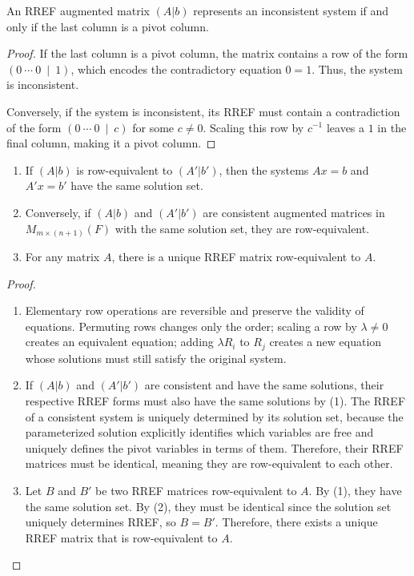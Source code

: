 \documentclass[../linear_algebra_and_groups.tex]{subfiles}
\begin{document}
\begin{theorem}
    \begin{shaded*}
        An RREF augmented matrix $(A|b)$ represents an inconsistent system if and only if the last column is a pivot column.
    \end{shaded*}
\end{theorem}
\begin{proof}
    If the last column is a pivot column, the matrix contains a row of the form $(0\ \cdots\ 0\ \mid\ 1)$, which encodes the contradictory equation $0 = 1$. Thus, the system is inconsistent. 
    
    Conversely, if the system is inconsistent, its RREF must contain a contradiction of the form $(0\ \cdots\ 0\ \mid\ c)$ for some $c \neq 0$. Scaling this row by $c^{-1}$ leaves a $1$ in the final column, making it a pivot column.
    \qedhere
\end{proof}

\begin{theorem}
    \begin{shaded*}\phantom{a}
        \begin{enumerate}
            \item If $(A|b)$ is row-equivalent to $(A'|b')$, then the systems $Ax=b$ and $A'x=b'$ have the same solution set.
            \item Conversely, if $(A|b)$ and $(A'|b')$ are consistent augmented matrices in $M_{m\times (n+1)}(F)$ with the same solution set, they are row-equivalent.
            \item For any matrix $A$, there is a unique RREF matrix row-equivalent to $A$.
        \end{enumerate}
    \end{shaded*}
\end{theorem}
\begin{proof}
    \begin{enumerate}
        \item Elementary row operations are reversible and preserve the validity of equations. Permuting rows changes only the order; scaling a row by $\lambda \neq 0$ creates an equivalent equation; adding $\lambda R_i$ to $R_j$ creates a new equation whose solutions must still satisfy the original system.
        \item If $(A|b)$ and $(A'|b')$ are consistent and have the same solutions, their respective RREF forms must also have the same solutions by (1). The RREF of a consistent system is uniquely determined by its solution set, because the parameterized solution explicitly identifies which variables are free and uniquely defines the pivot variables in terms of them. Therefore, their RREF matrices must be identical, meaning they are row-equivalent to each other.
        \item Let $B$ and $B'$ be two RREF matrices row-equivalent to $A$. By (1), they have the same solution set. By (2), they must be identical since the solution set uniquely determines RREF, so $B=B'$. Therefore, there exists a unique RREF matrix that is row-equivalent to $A$.\qedhere
        \qedhere
    \end{enumerate}
\end{proof}
\end{document}
